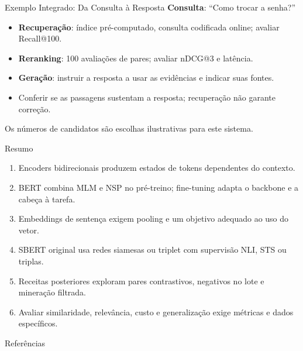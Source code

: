 \documentclass[aspectratio=169, xcolor=dvipsnames]{beamer}
\begin{document}
  \begin{frame}{Exemplo Integrado: Da Consulta à Resposta}
    \textbf{Consulta}: ``Como trocar a senha?''
    \begin{center}
    \end{center}
    \begin{itemize}
      \item \textbf{Recuperação}: índice pré-computado, consulta codificada online; avaliar Recall@100.
      \item \textbf{Reranking}: 100 avaliações de pares; avaliar nDCG@3 e latência.
      \item \textbf{Geração}: instruir a resposta a usar as evidências e indicar suas fontes.
      \item Conferir se as passagens sustentam a resposta; recuperação não garante correção.
    \end{itemize}
    \small Os números de candidatos são escolhas ilustrativas para este sistema.
  \end{frame}

  \begin{frame}{Resumo}
    \begin{enumerate}
      \item Encoders bidirecionais produzem estados de tokens dependentes do contexto.
      \item BERT combina MLM e NSP no pré-treino; fine-tuning adapta o backbone e a cabeça à tarefa.
      \item Embeddings de sentença exigem pooling e um objetivo adequado ao uso do vetor.
      \item SBERT original usa redes siamesas ou triplet com supervisão NLI, STS ou triplas.
      \item Receitas posteriores exploram pares contrastivos, negativos no lote e mineração filtrada.
      \item Avaliar similaridade, relevância, custo e generalização exige métricas e dados específicos.
    \end{enumerate}
  \end{frame}

  \begin{frame}[allowframebreaks]{Referências}
    \printbibliography[heading=none]
  \end{frame}
\end{document}
